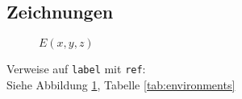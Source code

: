 \documentclass{article}
\begin{document}
\newcommand{\drawgrid}[4]{
	\draw[style={help lines, color=blue!50}] (#1, #2) grid (#3, #4);
	\draw (0, #2) -- (0, #4);
	\draw (#1, 0) -- (#3, 0);
}
\newcommand{\ellipseX}{cos(\x r)*1.5}
\newcommand{\ellipseY}{0.5+sin(\x r)*0.5}
\newcommand{\inverseX}[2]{((#1)/((#1)^2 + (#2)^2))}
\newcommand{\inverseY}[2]{((#2)/((#1)^2 + (#2)^2))}
\newcommand{\inverseellipseX}{\inverseX{\ellipseX}{\ellipseY}}
\newcommand{\inverseellipseY}{\inverseY{\ellipseX}{\ellipseY}}

\subsection{Zeichnungen}
\begin{figure}
	\caption{ $E(x, y, z)$ }
	\label{fig:ellipse}
\end{figure}

Verweise auf {\tt label} mit {\tt ref}: \\
Siehe Abbildung \ref{fig:ellipse},
	Tabelle \ref{tab:environments}


%
%
%
%
\end{document}
